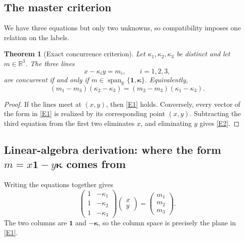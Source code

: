 \documentclass[12pt]{article}
\newtheorem{theorem}{Theorem}[section]
\newcommand{\R}{\mathbb{R}}
\begin{document}
\subsection{The master criterion}
We have three equations but only two unknowns, so compatibility imposes one relation on the labels.

\begin{theorem}[Exact concurrence criterion]
Let $\kappa_1,\kappa_2,\kappa_3$ be distinct and let $m\in\R^3$. The three lines
\[
x-\kappa_i y=m_i,\qquad i=1,2,3,
\]
are concurrent if and only if $m\in\operatorname{span}_{\R}\{\mathbf 1,\boldsymbol\kappa\}$. Equivalently,
\begin{equation}\tag{E2}\label{E2}
(m_1-m_3)(\kappa_2-\kappa_3)
=(m_2-m_3)(\kappa_1-\kappa_3).
\end{equation}
\end{theorem}

\begin{proof}
If the lines meet at $(x,y)$, then \eqref{E1} holds. Conversely, every vector of the form in \eqref{E1} is realized by its corresponding point $(x,y)$. Subtracting the third equation from the first two eliminates $x$, and eliminating $y$ gives \eqref{E2}.
\end{proof}

\subsection{Linear-algebra derivation: where the form $m=x\mathbf 1-y\boldsymbol\kappa$ comes from}
Writing the equations together gives
\[
\begin{pmatrix}
1&-\kappa_1\\
1&-\kappa_2\\
1&-\kappa_3
\end{pmatrix}
\begin{pmatrix}x\\y\end{pmatrix}
=
\begin{pmatrix}m_1\\m_2\\m_3\end{pmatrix}.
\]
The two columns are $\mathbf1$ and $-\boldsymbol\kappa$, so the column space is precisely the plane in \eqref{E1}.
\end{document}
